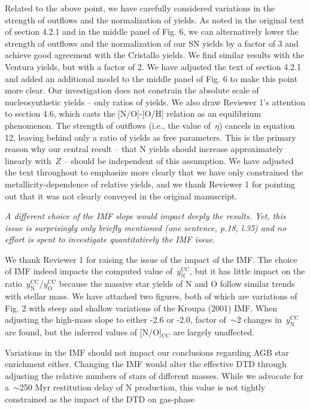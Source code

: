 \documentclass[12pt]{article}
\newcommand{\ycc}[1]{\ensuremath{y_\text{#1}^\text{CC}}}
\newcommand\doublebreak[0]{\par\null\par\noindent}
\begin{document}
\doublebreak
Related to the above point, we have carefully considered variations in the
strength of outflows and the normalization of yields.
As noted in the original text of section 4.2.1 and in the middle panel of Fig.
6, we can alternatively lower the strength of outflows and the normalization of
our SN yields by a factor of 3 and achieve good agreement with the Cristallo
yields.
We find similar results with the Ventura yields, but with a factor of 2.
We have adjusted the text of section 4.2.1 and added an additional model to the
middle panel of Fig. 6 to make this point more clear.
Our investigation does not constrain the absolute scale of nucleosynthetic
yields -- only ratios of yields.
We also draw Reviewer 1's attention to section 4.6, which casts the [N/O]-[O/H]
relation as an equilibrium phenomenon.
The strength of outflows (i.e., the value of~$\eta$) cancels in equation 12,
leaving behind only a ratio of yields as free parameters.
This is the primary reason why our central result -- that N yields should
increase approximately linearly with~$Z$ -- should be independent of this
assumption.
We have adjusted the text throughout to emphasize more clearly that we have
only constrained the metallicity-dependence of relative yields, and we thank
Reviewer 1 for pointing out that it was not clearly conveyed in the original
manuscript.
\doublebreak
\textit{%
A different choice of the IMF slope would impact deeply the results.
Yet, this issue is surprisingly only briefly mentioned (one sentence, p.18,
l.35) and no effort is spent to investigate quantitatively the IMF issue.
}
\doublebreak
We thank Reviewer 1 for raising the issue of the impact of the IMF.
The choice of IMF indeed impacts the computed value of~$\ycc{N}$, but it has
little impact on the ratio~$\ycc{N} / \ycc{O}$ because the massive star yields
of N and O follow similar trends with stellar mass.
We have attached two figures, both of which are variations of Fig. 2 with
steep and shallow variations of the Kroupa (2001) IMF.
When adjusting the high-mass slope to either -2.6 or -2.0, factor of~$\sim$2
changes in~$\ycc{N}$ are found, but the inferred values of [N/O]$_\text{CC}$
are largely unaffected.
\par
Variations in the IMF should not impact our conclusions regarding AGB star
enrichment either.
Changing the IMF would alter the effective DTD through adjusting the relative
numbers of stars of different masses.
While we advocate for a~$\sim$250 Myr restitution delay of N production, this
value is not tightly constrained as the impact of the DTD on gas-phase
\end{document}
